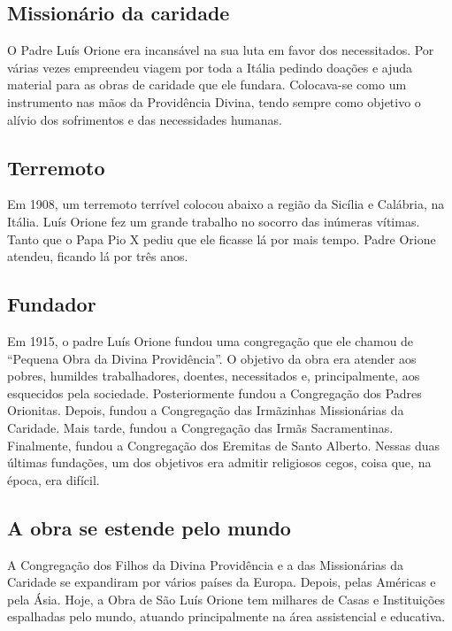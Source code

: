 \documentclass[a4paper,14pt]{extarticle} \usepackage[utf8]{inputenc}
\begin{document}
\subsection{Missionário da caridade}

O Padre Luís Orione era incansável na sua luta em favor dos necessitados. Por várias vezes empreendeu viagem por toda a Itália pedindo doações e ajuda material para as obras de caridade que ele fundara. Colocava-se como um instrumento nas mãos da Providência Divina, tendo sempre como objetivo o alívio dos sofrimentos e das necessidades humanas.

\subsection{Terremoto}

Em 1908, um terremoto terrível colocou abaixo a região da Sicília e Calábria, na Itália. Luís Orione fez um grande trabalho no socorro das inúmeras vítimas. Tanto que o Papa Pio X pediu que ele ficasse lá por mais tempo. Padre Orione atendeu, ficando lá por três anos.

\subsection{Fundador}

Em 1915, o padre Luís Orione fundou uma congregação que ele chamou de “Pequena Obra da Divina Providência”. O objetivo da obra era atender aos pobres, humildes trabalhadores, doentes, necessitados e, principalmente, aos esquecidos pela sociedade. Posteriormente fundou a Congregação dos Padres Orionitas. Depois, fundou a Congregação das Irmãzinhas Missionárias da Caridade. Mais tarde, fundou a Congregação das Irmãs Sacramentinas. Finalmente, fundou a Congregação dos Eremitas de Santo Alberto. Nessas duas últimas fundações, um dos objetivos era admitir religiosos cegos, coisa que, na época, era difícil. 

\subsection{A obra se estende pelo mundo}

A Congregação dos Filhos da Divina Providência e a das Missionárias da Caridade se expandiram por vários países da Europa. Depois, pelas Américas e pela Ásia. Hoje, a Obra de São Luís Orione tem milhares de Casas e Instituições espalhadas pelo mundo, atuando principalmente na área assistencial e educativa.
\end{document}
